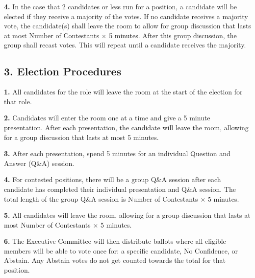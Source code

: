 \documentclass{article}
\begin{document}
\textbf{4.} In the case that 2 candidates or less run for a position, a candidate will be elected if they receive a majority of the votes. If no candidate receives a majority vote, the candidate(s) shall leave the room to allow for group discussion that lasts at most Number of Contestants $\times$ 5 minutes. After this group discussion, the group shall recast votes. This will repeat until a candidate receives the majority.  

\subsection{3. Election Procedures}

\textbf{1.} All candidates for the role will leave the room at the start of the election for that role. 

\textbf{2.} Candidates will enter the room one at a time and give a 5 minute presentation. After each presentation, the candidate will leave the room, allowing for a group discussion that lasts at most 5 minutes.

\textbf{3.} After each presentation, spend 5 minutes for an individual Question and Answer (Q\&A) session.

\textbf{4.} For contested positions, there will be a group Q\&A session after each candidate has completed their individual presentation and Q\&A session. The total length of the group Q\&A session is Number of Contestants $\times$ 5 minutes.

\textbf{5.} All candidates will leave the room, allowing for a group discussion that lasts at most Number of Contestants $\times $ 5 minutes. 

\textbf{6.} The Executive Committee will then distribute ballots where all eligible members will be able to vote once for: a specific candidate, No Confidence, or Abstain. Any Abstain votes do not get counted towards the total for that position. 
\end{document}

